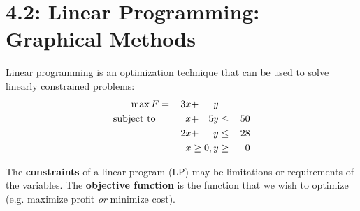 \documentclass[../mathNotesPreamble]{subfiles}
\providecommand{\relscalefact}{1.4}
\begin{document}
\relscale{\relscalefact}
  \section{4.2: Linear Programming: Graphical Methods}
    \begin{defn*}
      Linear programming is an optimization technique that can be used to solve linearly constrained problems:
      \begin{alignat*}{4}
        \max F&=&\,3x&+&y\\
        \textnormal{subject to }&& x&+&5y&\leq &\,50\\
          &&2x&+&y&\leq& 28\\
          &&&&\mathllap{x\geq 0}, y&\geq& 0
      \end{alignat*}

      The \textbf{constraints} of a linear program (LP) may be limitations or requirements of the variables. The \textbf{objective function} is the function that we wish to optimize (e.g. maximize profit \emph{or} minimize cost).
    \end{defn*}
\end{document}
